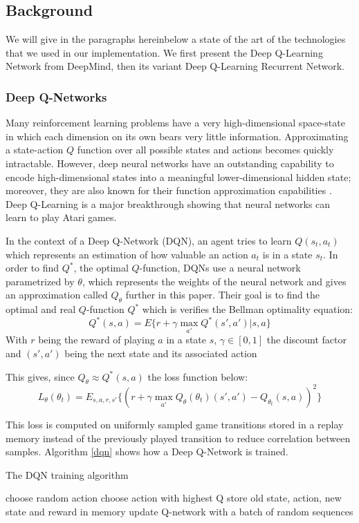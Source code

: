 \documentclass[letterpaper]{article}
\begin{document}
\subsection{Background} We will give in the paragraphs hereinbelow a state of
the art of the technologies that we used in our implementation. We first present
the Deep Q-Learning Network from DeepMind, then its variant Deep Q-Learning
Recurrent Network.

\subsubsection{Deep Q-Networks}
Many reinforcement learning problems have a very high-dimensional space-state
in which each dimension on its own bears very little information. Approximating
a state-action $Q$ function over all possible states and actions becomes quickly
intractable. However, deep neural networks have an outstanding capability to
encode high-dimensional states into a meaningful lower-dimensional hidden state; 
moreover, they are also known for their function approximation capabilities
\citep{Hornik1991}. Deep Q-Learning \citep{Mnih2015} is a major breakthrough
showing that neural networks can learn to play Atari games.

In the context of a Deep Q-Network (DQN), an agent tries to learn
$Q(s_t,a_t)$ which represents an
estimation of how valuable an action $a_t$ is in a state $s_t$. In order to
find $Q^*$, the optimal $Q$-function, DQNs use a neural network
parametrized by $\theta$, which represents the weights of the neural network
and gives an approximation called $Q_\theta$ further in this paper. Their goal
is to find the optimal and real $Q$-function $Q^*$ which is verifies the Bellman
optimality equation:
$$ Q^*(s,a) = E\{r + \gamma \max_{a'}Q^*(s',a')|s,a\} $$
With $r$ being the reward of playing $a$ in a state $s$, $\gamma\in [0,1]$ the
discount factor and $(s',a')$ being the next state and its associated action

This gives, since $Q_{\theta} \approx Q^*(s,a)$ the loss function below:
$$ L_\theta(\theta_t) = E_{s,a,r,s'}\{(r +\gamma \max_{a'}Q_\theta(\theta_t)(s' , a' )-Q_{\theta_t}(s,a))^2\}$$

This loss is computed on uniformly sampled game transitions stored in a
replay memory instead of the previously played transition to reduce correlation
between samples. Algorithm \ref{dqn} shows how a Deep Q-Network is trained.
\begin{algorithm}
\caption{The DQN training algorithm}\label{dqn}
\begin{algorithmic}[1]
				\State choose random action
			\Else
				\State choose action with highest Q
			\EndIf
			\State store old state, action, new state and reward in memory
		\EndWhile
			\State update Q-network with a batch of random sequences
		\EndFor
	\EndFor
\end{algorithmic}
\end{algorithm}
\end{document}
